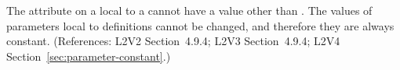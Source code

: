 The  attribute on a \Parameter local to a \KineticLaw cannot
have a value other than .  The values of parameters local to
\KineticLaw definitions cannot be changed, and therefore they are always
constant.  (References: L2V2 Section~4.9.4; L2V3
Section~4.9.4; L2V4 Section~\ref{sec:parameter-constant}.)
